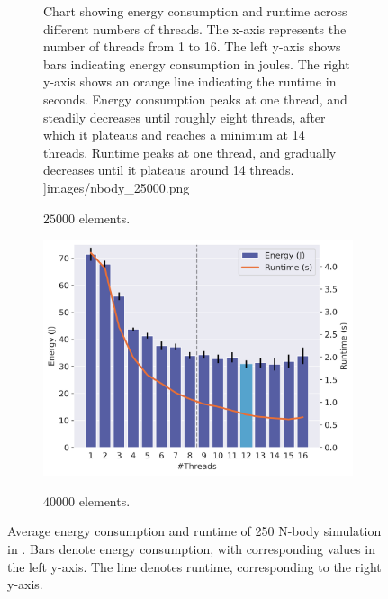 \begin{figure}[!ht]
\begin{subfigure}{0.33\linewidth}
{            Chart showing energy consumption and runtime across different numbers of threads. The
            x-axis represents the number of threads from 1 to 16. The left y-axis shows bars
            indicating energy consumption in joules. The right y-axis shows an orange line
            indicating the runtime in seconds. Energy consumption peaks at one thread, and steadily
            decreases until roughly eight threads, after which it plateaus and reaches a minimum at
            14 threads. Runtime peaks at one thread, and gradually decreases until it plateaus
            around 14 threads.
        }]{images/nbody_25000.png}
        \caption{$25000$ elements.}
        \label{fig:nbody2}
    \end{subfigure}%
    \begin{subfigure}{0.33\linewidth}
        \includegraphics[width=\linewidth,alt={
            Chart showing energy consumption and runtime across different numbers of threads. The
            x-axis represents the number of threads from 1 to 16. The left y-axis shows bars
            indicating energy consumption in joules. The right y-axis shows an orange line
            indicating the runtime in seconds. Energy consumption peaks at one thread, and steadily
            decreases until roughly eight threads, after which it plateaus and reaches a minimum at
            12 threads. Runtime peaks at one thread, and gradually decreases until it plateaus
            around 12 threads.
        }]{images/nbody_40000.png}
        \caption{$40000$ elements.}
        \label{fig:nbody3}
    \end{subfigure}%
    \caption{Average energy consumption and runtime of 250 N-body simulation in \sac{}.
    Bars denote energy consumption, with corresponding values in the left y-axis.
    The line denotes runtime, corresponding to the right y-axis.}
    \label{fig:nbody}
\end{figure}

